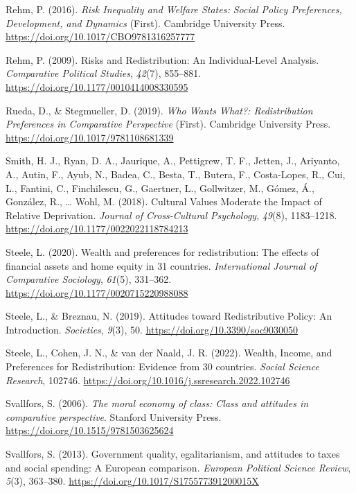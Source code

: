 \documentclass[
  12pt,
]{book}
\newlength{\cslhangindent}
\newenvironment{cslreferences}%
  {\setlength{\parindent}{0pt}%
  \everypar{\setlength{\hangindent}{\cslhangindent}}\ignorespaces}%
  {\par}
\begin{document}
\begin{cslreferences}
\leavevmode\hypertarget{ref-rehm_risk_2016}{}%
Rehm, P. (2016). \emph{Risk Inequality and Welfare States: Social Policy Preferences, Development, and Dynamics} (First). Cambridge University Press. \url{https://doi.org/10.1017/CBO9781316257777}

\leavevmode\hypertarget{ref-rehm_risks_2009}{}%
Rehm, P. (2009). Risks and Redistribution: An Individual-Level Analysis. \emph{Comparative Political Studies}, \emph{42}(7), 855--881. \url{https://doi.org/10.1177/0010414008330595}

\leavevmode\hypertarget{ref-rueda_who_2019}{}%
Rueda, D., \& Stegmueller, D. (2019). \emph{Who Wants What?: Redistribution Preferences in Comparative Perspective} (First). Cambridge University Press. \url{https://doi.org/10.1017/9781108681339}

\leavevmode\hypertarget{ref-smithCulturalValuesModerate2018}{}%
Smith, H. J., Ryan, D. A., Jaurique, A., Pettigrew, T. F., Jetten, J., Ariyanto, A., Autin, F., Ayub, N., Badea, C., Besta, T., Butera, F., Costa-Lopes, R., Cui, L., Fantini, C., Finchilescu, G., Gaertner, L., Gollwitzer, M., Gómez, Á., González, R., \ldots{} Wohl, M. (2018). Cultural Values Moderate the Impact of Relative Deprivation. \emph{Journal of Cross-Cultural Psychology}, \emph{49}(8), 1183--1218. \url{https://doi.org/10.1177/0022022118784213}

\leavevmode\hypertarget{ref-steele_wealth_2020}{}%
Steele, L. (2020). Wealth and preferences for redistribution: The effects of financial assets and home equity in 31 countries. \emph{International Journal of Comparative Sociology}, \emph{61}(5), 331--362. \url{https://doi.org/10.1177/0020715220988088}

\leavevmode\hypertarget{ref-steele_attitudes_2019}{}%
Steele, L., \& Breznau, N. (2019). Attitudes toward Redistributive Policy: An Introduction. \emph{Societies}, \emph{9}(3), 50. \url{https://doi.org/10.3390/soc9030050}

\leavevmode\hypertarget{ref-steele_wealth_2022}{}%
Steele, L., Cohen, J. N., \& van der Naald, J. R. (2022). Wealth, Income, and Preferences for Redistribution: Evidence from 30 countries. \emph{Social Science Research}, 102746. \url{https://doi.org/10.1016/j.ssresearch.2022.102746}

\leavevmode\hypertarget{ref-Svallfors2006}{}%
Svallfors, S. (2006). \emph{The moral economy of class: Class and attitudes in comparative perspective}. Stanford University Press. \url{https://doi.org/10.1515/9781503625624}

\leavevmode\hypertarget{ref-svallfors_government_2013}{}%
Svallfors, S. (2013). Government quality, egalitarianism, and attitudes to taxes and social spending: A European comparison. \emph{European Political Science Review}, \emph{5}(3), 363--380. \url{https://doi.org/10.1017/S175577391200015X}


\end{cslreferences}
\end{document}
